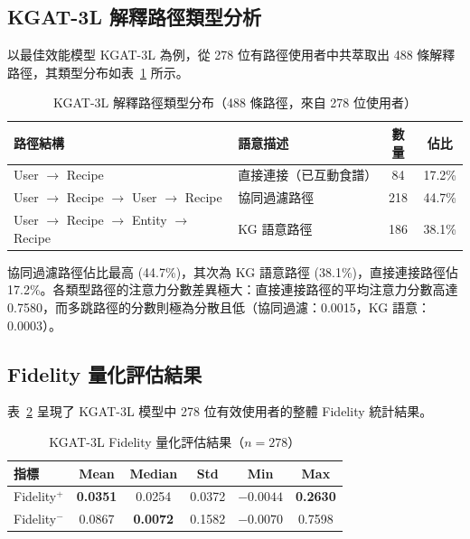 \subsection{KGAT-3L 解釋路徑類型分析}

以最佳效能模型 KGAT-3L 為例，從 278 位有路徑使用者中共萃取出 488 條解釋路徑，其類型分布如表~\ref{tab:path_types} 所示。

\begin{table}[htbp]
  \centering
  \caption{KGAT-3L 解釋路徑類型分布（488 條路徑，來自 278 位使用者）}
  \label{tab:path_types}
  \begin{tabular}{llcc}
    \toprule
    路徑結構 & 語意描述 & 數量 & 佔比 \\
    \midrule
    User $\to$ Recipe & 直接連接（已互動食譜） & 84 & 17.2\% \\
    User $\to$ Recipe $\to$ User $\to$ Recipe & 協同過濾路徑 & 218 & 44.7\% \\
    User $\to$ Recipe $\to$ Entity $\to$ Recipe & KG 語意路徑 & 186 & 38.1\% \\
    \bottomrule
  \end{tabular}
\end{table}

協同過濾路徑佔比最高 (44.7\%)，其次為 KG 語意路徑 (38.1\%)，直接連接路徑佔 17.2\%。各類型路徑的注意力分數差異極大：直接連接路徑的平均注意力分數高達 0.7580，而多跳路徑的分數則極為分散且低（協同過濾：0.0015，KG 語意：0.0003）。

\subsection{Fidelity 量化評估結果}

表~\ref{tab:fidelity_overall} 呈現了 KGAT-3L 模型中 278 位有效使用者的整體 Fidelity 統計結果。

\begin{table}[htbp]
  \centering
  \caption{KGAT-3L Fidelity 量化評估結果（$n = 278$）}
  \label{tab:fidelity_overall}
  \begin{tabular}{l ccccc}
    \toprule
    指標 & Mean & Median & Std & Min & Max \\
    \midrule
    Fidelity$^+$ & \textbf{0.0351} & 0.0254 & 0.0372 & $-0.0044$ & \textbf{0.2630} \\
    Fidelity$^-$ & 0.0867 & \textbf{0.0072} & 0.1582 & $-0.0070$ & 0.7598 \\
    \bottomrule
  \end{tabular}
\end{table}

